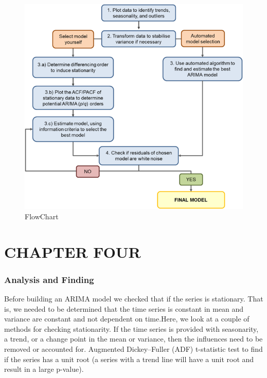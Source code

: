 \documentclass[
  onepage,
  openany]{scrbook}
\begin{document}
\begin{figure}

{\centering \includegraphics{Plots/Steps.png}

}

\caption{FlowChart}

\end{figure}

\hypertarget{chapter-four}{%
\chapter{CHAPTER FOUR}\label{chapter-four}}

\hypertarget{analysis-and-finding}{%
\subsection{Analysis and Finding}\label{analysis-and-finding}}

Before building an ARIMA model we checked that if the series is
stationary. That is, we needed to be determined that the time series is
constant in mean and variance are constant and not dependent on
time.Here, we look at a couple of methods for checking stationarity. If
the time series is provided with seasonarity, a trend, or a change point
in the mean or variance, then the influences need to be removed or
accounted for. Augmented Dickey--Fuller (ADF) t-statistic test to find
if the series has a unit root (a series with a trend line will have a
unit root and result in a large p-value).
\end{document}
